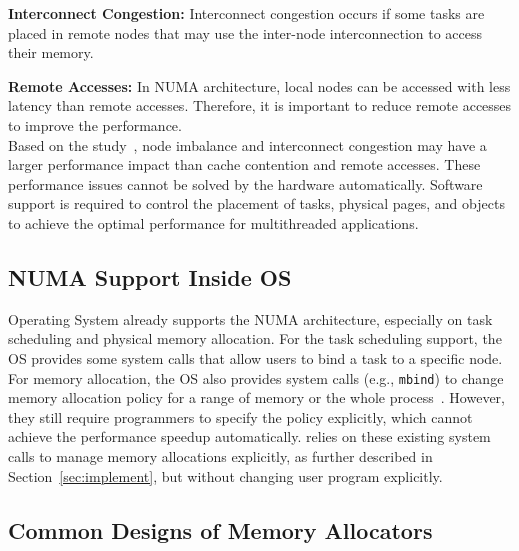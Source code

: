 \textbf{Interconnect Congestion:} Interconnect congestion occurs if some tasks are placed in remote nodes that may use the inter-node interconnection to access their memory. 

\textbf{Remote Accesses:} In NUMA architecture, local nodes can be accessed with less latency than remote accesses. Therefore, it is important to reduce remote accesses to improve the performance.\\


 Based on the study~\cite{Blagodurov:2011:CNC:2002181.2002182}, node imbalance and interconnect congestion may have a larger performance impact than cache contention and remote accesses. These performance issues cannot be solved by the hardware automatically. Software support is required to control the placement of tasks, physical pages, and objects to achieve the optimal performance for multithreaded applications.  

\subsection{NUMA Support Inside OS} 
Operating System already supports the NUMA architecture, especially on task scheduling and physical memory allocation. For the task scheduling support, the OS provides some system calls that allow users to bind a task to a specific node. For memory allocation, the OS also provides system calls (e.g., \texttt{mbind}) to change memory allocation policy for a range of memory or the whole process~\cite{lameter2013numa, diener2015locality}. However, they still require programmers to specify the policy explicitly, which cannot achieve the performance speedup automatically. \NM{} relies on these existing system calls to manage memory allocations explicitly, as further described in Section~\ref{sec:implement}, but without changing user program explicitly.

\subsection{Common Designs of Memory Allocators}
\label{sec:commondesign}

